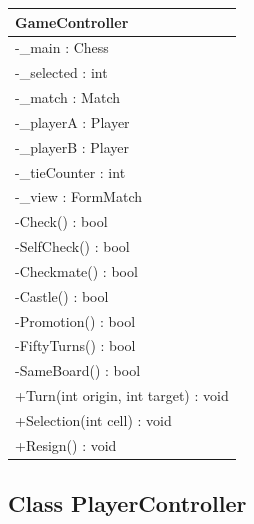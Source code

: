 \documentclass[12pt]{article}
\begin{document}
\begin{table}[H]
    \begin{tabular}{|l|}
    \hline
    \rowcolor[HTML]{C0C0C0} 
    \textbf{GameController}              \\ \hline
    \rowcolor[HTML]{EFEFEF} 
    -\_main : Chess                      \\ \hline
    \rowcolor[HTML]{EFEFEF} 
    -\_selected : int                    \\ \hline
    \rowcolor[HTML]{EFEFEF} 
    -\_match : Match                     \\ \hline
    \rowcolor[HTML]{EFEFEF} 
    -\_playerA : Player                  \\ \hline
    \rowcolor[HTML]{EFEFEF} 
    -\_playerB : Player                  \\ \hline
    \rowcolor[HTML]{EFEFEF} 
    -\_tieCounter : int                  \\ \hline
    \rowcolor[HTML]{EFEFEF} 
    -\_view : FormMatch                  \\ \hline
    -Check() : bool                      \\ \hline
    -SelfCheck() : bool                  \\ \hline
    -Checkmate() : bool                  \\ \hline
    -Castle() : bool                     \\ \hline
    -Promotion() : bool                  \\ \hline
    -FiftyTurns() : bool                 \\ \hline
    -SameBoard() : bool                  \\ \hline
    +Turn(int origin, int target) : void \\ \hline
    +Selection(int cell) : void          \\ \hline
    +Resign() : void                     \\ \hline
    \end{tabular}
\end{table}



\newpage


\subsection{Class PlayerController}
\end{document}

